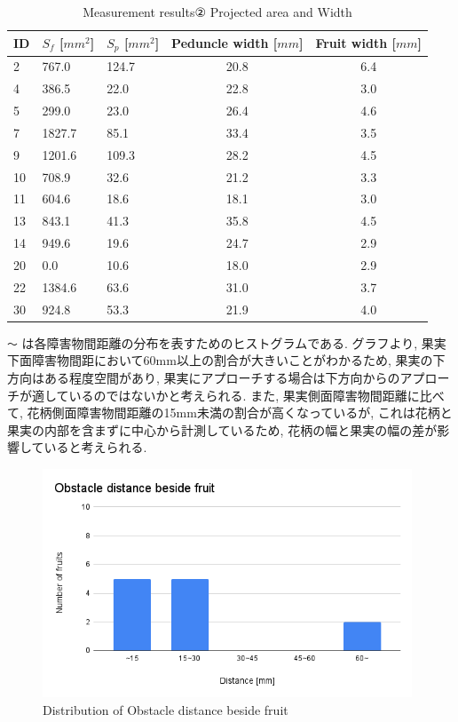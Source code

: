 \begin{table}[H]
  \begin{center}
    \begin{tabular}{l|p{30mm}p{30mm}cc}
      ID & $S_f$ [$mm^2$] & $S_p$ [$mm^2$] & Peduncle width [$mm$] & Fruit width [$mm$]\\ \hline\hline
      2 & 767.0 & 124.7 & 20.8 & 6.4\\
      4 & 386.5 & 22.0 & 22.8 & 3.0\\
      5 & 299.0 & 23.0 & 26.4 & 4.6\\
      7 & 1827.7 & 85.1 & 33.4 & 3.5\\
      9 & 1201.6 & 109.3 & 28.2 & 4.5\\
      10 & 708.9 & 32.6 & 21.2 & 3.3\\
      11 & 604.6 & 18.6 & 18.1 & 3.0\\
      13 & 843.1 & 41.3 & 35.8 & 4.5\\
      14 & 949.6 & 19.6 & 24.7 & 2.9\\
      20 & 0.0 & 10.6 & 18.0 & 2.9\\
      22 & 1384.6 & 63.6 & 31.0 & 3.7\\
      30 & 924.8 & 53.3 & 21.9 & 4.0\\
    \end{tabular}
    \caption{Measurement results② Projected area and Width}
    \label{Tab:measurementresults2}
  \end{center}
\end{table}

 \verb|〜|  は各障害物間距離の分布を表すためのヒストグラムである.
グラフより, 果実下面障害物間距において60mm以上の割合が大きいことがわかるため, 果実の下方向はある程度空間があり, 果実にアプローチする場合は下方向からのアプローチが適しているのではないかと考えられる.
また, 果実側面障害物間距離に比べて, 花柄側面障害物間距離の15mm未満の割合が高くなっているが, これは花柄と果実の内部を含まずに中心から計測しているため, 花柄の幅と果実の幅の差が影響していると考えられる.

\vspace{5mm}
\begin{figure}[H]
     \centering
     \includegraphics[width=110mm]{images/png/resultbesidef.png}
     \caption{Distribution of Obstacle distance beside fruit}
     \label{Fig:resultbesidef}
\end{figure}

